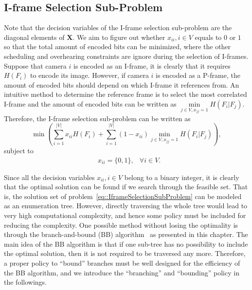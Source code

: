 \subsection{I-frame Selection Sub-Problem}
Note that the decision variables of the I-frame selection sub-problem are the diagonal elements of $\mathbf{X}$.
We aim to figure out whether ${x_{ii},i \in V}$ equals to $0$ or $1$ so that the total amount of encoded bits can be minimized, where the other scheduling and overhearing constraints are ignore during the selection of I-frames.
Suppose that camera $i$ is encoded as an I-frame, it is clearly that it requires $H(F_i)$ to encode its image.
However, if camera $i$ is encoded as a P-frame, the amount of encoded bits should depend on which I-frame it references from.
An intuitive method to determine the reference frame is to select the most correlated I-frame and the amount of encoded bits can be written as $\underset{j \in V, x_{jj}=1}{\min} H(F_i|F_j)$.
Therefore, the I-frame selection sub-problem can be written as
\begin{equation*}
\min \left(
\sum_{i=1}^{|V|} x_{ii}H(F_i) +
\sum_{i=1}^{|V|} (1-x_{ii}) \underset{j \in V, x_{jj}=1}{\min} H(F_i|F_j) \right),
\end{equation*}
subject to
\begin{align}
&x_{ii} = \{0,1\}, &\forall i \in V.
\label{eq::IframeSelectionSubProblem}
\end{align}

Since all the decision variables ${x_{ii},i \in V}$ belong to a binary integer, it is clearly that the optimal solution can be found if we search through the feasible set.
That is, the solution set of problem~\eqref{eq::IframeSelectionSubProblem} can be modeled as an enumeration tree.
However, directly traversing the whole tree would lead to very high computational complexity, and hence some policy must be included for reducing the complexity.
One possible method without losing the optimality is through the branch-and-bound (BB) algorithm~\cite{BB} as presented in this chapter.
The main idea of the BB algorithm is that if one sub-tree has no possibility to include the optimal solution, then it is not required to be traversed any more.
Therefore, a proper policy to ``bound'' branches must be well designed for the efficiency of the BB algorithm, and we introduce the ``branching'' and ``bounding'' policy in the followings.
%
